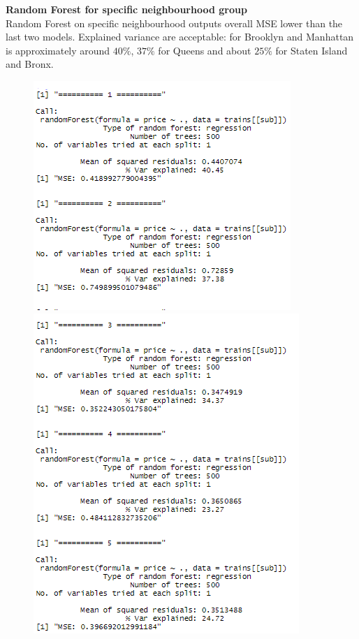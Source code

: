\documentclass{FR16}
\begin{document}
\noindent \textbf{Random Forest for specific neighbourhood group}\\
Random Forest on specific neighbourhood outputs overall MSE lower than the last two models. Explained variance are acceptable: for Brooklyn and Manhattan is approximately around $40\%$, $37\%$ for Queens and about $25\%$ for Staten Island and Bronx. 
\begin{figure}[!htb]
   \begin{minipage}{0.48\textwidth}
     \centering
     \includegraphics[width=1\linewidth]{figures/rf1.1.png} 
   \end{minipage}\hfill
   \begin{minipage}{0.48\textwidth}
     \centering
     \includegraphics[width=1\linewidth]{figures/rf1.2.png}

\end{minipage}
\end{figure}
\end{document}
